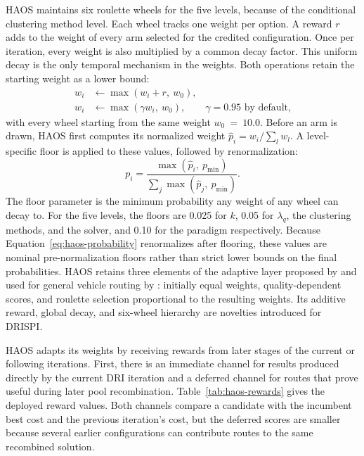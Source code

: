 HAOS maintains six roulette wheels for the five levels, because of the conditional clustering method level. Each wheel tracks one weight per option. A reward $r$ adds to the weight of every arm selected for the credited configuration. Once per iteration, every weight is also multiplied by a common decay factor. This uniform decay is the only temporal mechanism in the weights. Both operations retain the starting weight as a lower bound:
\begin{align}
w_i &\leftarrow \max(w_i + r,\ w_0), \label{eq:haos-update}\\
w_i &\leftarrow \max(\gamma w_i,\ w_0), \qquad \gamma = 0.95 \text{ by default,} \label{eq:haos-decay}
\end{align}
with every wheel starting from the same weight $w_0~=~10.0$.  Before an arm is drawn, HAOS first computes its normalized weight $\hat{p}_i = w_i / \sum_l w_l$. A level-specific floor is applied to these values, followed by renormalization:
\begin{equation}
p_i = \frac{\max(\hat{p}_i,\ p_{\mathrm{min}})}{\sum_j \max(\hat{p}_j,\ p_{\mathrm{min}})}.
\label{eq:haos-probability}
\end{equation}
The floor parameter is the minimum probability any weight of any wheel can decay to. For the five levels, the floors are 0.025 for $k$, 0.05 for $\lambda_q$, the clustering methods, and the solver, and 0.10 for the paradigm respectively. Because Equation~\ref{eq:haos-probability} renormalizes after flooring, these values are nominal pre-normalization floors rather than strict lower bounds on the final probabilities. HAOS retains three elements of the adaptive layer proposed by \citet{ropkeAdaptiveLargeNeighborhood2006} and used for general vehicle routing by \citet{pisingerGeneralHeuristicVehicle2007}: initially equal weights, quality-dependent scores, and roulette selection proportional to the resulting weights. Its additive reward, global decay, and six-wheel hierarchy are novelties introduced for DRISPI\@.

HAOS adapts its weights by receiving rewards from later stages of the current or following iterations. First, there is an immediate channel for results produced directly by the current DRI iteration and a deferred channel for routes that prove useful during later pool recombination. Table~\ref{tab:haos-rewards} gives the deployed reward values. Both channels compare a candidate with the incumbent best cost and the previous iteration's cost, but the deferred scores are smaller because several earlier configurations can contribute routes to the same recombined solution.


